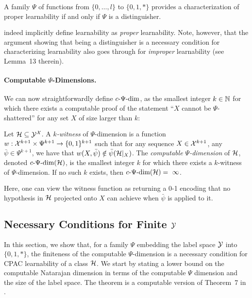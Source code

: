 \documentclass[11pt]{article}
\begin{document}
\begin{theorem}
\label{thm:bd92}
    A family $\Psi$ of functions from $\{0,\dots,l\}$ to $\{0,1,*\}$ provides a characterization of proper learnability if and only if $\Psi$  is a distinguisher.
\end{theorem}

\cite{ben1992characterizations} indeed implicitly define learnability as \emph{proper} learnability. 
Note, however, that the argument showing that being a distinguisher is a necessary condition for characterizing learnability also goes through for \emph{improper} learnability (see Lemma~13 therein).

\paragraph{Computable $\Psi$-Dimensions.}
We can now straightforwardly define $c\text{-}\Psi\text{-}\mathrm{dim}$, as the smallest integer $k\in\mathbb{N}$ for which there exists a computable proof of the statement ``$X$ cannot be $\Psi$-shattered'' for any set $X$ of size larger than $k$:

\begin{definition}
    Let $\mathcal{H}\subseteq \mathcal{Y}^{\mathcal{X}}$.
    A \emph{$k$-witness} of $\Psi$-dimension is a function $w:\mathcal{X}^{k+1}\times\Psi^{k+1}\rightarrow\{0,1\}^{k+1}$ such that for any sequence $X\in\mathcal{X}^{k+1}$, any $\bar{\psi}\in\Psi^{k+1}$, we have that $w(X,\bar{\psi})\notin\bar{\psi}(\mathcal{H}|_X)$.
    The \emph{computable $\Psi$-dimension} of $\mathcal{H}$, denoted $c\text{-}\Psi\text{-}\mathrm{dim}(\mathcal{H})$, is the smallest integer $k$ for which there exists a $k$-witness of $\Psi$-dimension.
    If no such $k$ exists, then $c\text{-}\Psi\text{-}\mathrm{dim}(\mathcal{H})=~\infty$.
\end{definition}

Here, one can view the witness function as returning a 0-1 encoding that no hypothesis in $\mathcal{H}$ projected onto $X$ can achieve when $\bar{\psi}$ is applied to it.

\subsection{Necessary Conditions for Finite $\mathcal{Y}$}
\label{sec:lb-c-psi-dim}

In this section, we show that, for a family $\Psi$ embedding the label space $\mathcal{Y}$ into $\{0,1,*\}$, the finiteness of the computable $\Psi$-dimension is a necessary condition for CPAC learnability of a class $\mathcal{H}$. 
We start by stating a lower bound on the computable Natarajan dimension in terms of the computable $\Psi$ dimension and the size of the label space. 
The theorem is a computable version of Theorem~7 in \cite{ben1992characterizations}.
\end{document}
